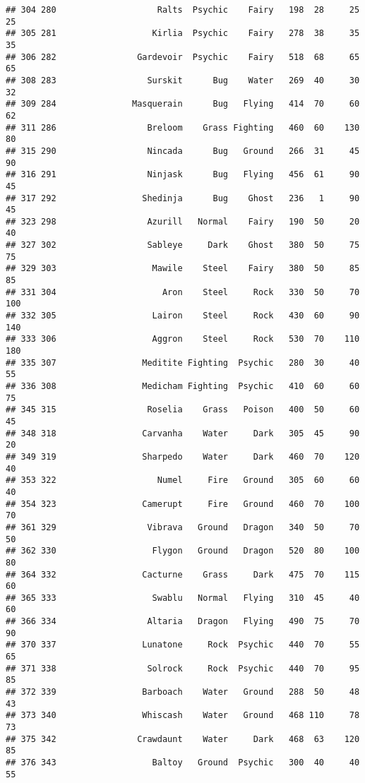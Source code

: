 \documentclass[
]{article}
\begin{document}
\begin{verbatim}
## 304 280                    Ralts  Psychic    Fairy   198  28     25      25
## 305 281                   Kirlia  Psychic    Fairy   278  38     35      35
## 306 282                Gardevoir  Psychic    Fairy   518  68     65      65
## 308 283                  Surskit      Bug    Water   269  40     30      32
## 309 284               Masquerain      Bug   Flying   414  70     60      62
## 311 286                  Breloom    Grass Fighting   460  60    130      80
## 315 290                  Nincada      Bug   Ground   266  31     45      90
## 316 291                  Ninjask      Bug   Flying   456  61     90      45
## 317 292                 Shedinja      Bug    Ghost   236   1     90      45
## 323 298                  Azurill   Normal    Fairy   190  50     20      40
## 327 302                  Sableye     Dark    Ghost   380  50     75      75
## 329 303                   Mawile    Steel    Fairy   380  50     85      85
## 331 304                     Aron    Steel     Rock   330  50     70     100
## 332 305                   Lairon    Steel     Rock   430  60     90     140
## 333 306                   Aggron    Steel     Rock   530  70    110     180
## 335 307                 Meditite Fighting  Psychic   280  30     40      55
## 336 308                 Medicham Fighting  Psychic   410  60     60      75
## 345 315                  Roselia    Grass   Poison   400  50     60      45
## 348 318                 Carvanha    Water     Dark   305  45     90      20
## 349 319                 Sharpedo    Water     Dark   460  70    120      40
## 353 322                    Numel     Fire   Ground   305  60     60      40
## 354 323                 Camerupt     Fire   Ground   460  70    100      70
## 361 329                  Vibrava   Ground   Dragon   340  50     70      50
## 362 330                   Flygon   Ground   Dragon   520  80    100      80
## 364 332                 Cacturne    Grass     Dark   475  70    115      60
## 365 333                   Swablu   Normal   Flying   310  45     40      60
## 366 334                  Altaria   Dragon   Flying   490  75     70      90
## 370 337                 Lunatone     Rock  Psychic   440  70     55      65
## 371 338                  Solrock     Rock  Psychic   440  70     95      85
## 372 339                 Barboach    Water   Ground   288  50     48      43
## 373 340                 Whiscash    Water   Ground   468 110     78      73
## 375 342                Crawdaunt    Water     Dark   468  63    120      85
## 376 343                   Baltoy   Ground  Psychic   300  40     40      55

\end{verbatim}
\end{document}
